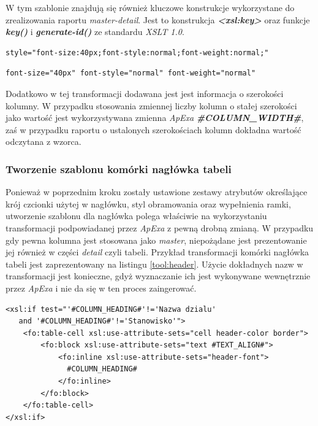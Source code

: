 \documentclass[11pt,a4paper]{article}
\begin{document}
W tym szablonie znajdują się również kluczowe konstrukcje wykorzystane do zrealizowania raportu \emph{master-detail}. Jest to konstrukcja \emph{\textbf{\textless xsl:key\textgreater}} oraz funkcje \emph{\textbf{key()}} i \emph{\textbf{generate-id()}} ze standardu \emph{XSLT 1.0}.

\lstset{}
\begin{lstlisting}[frame=single,caption=Przykład stylu obiektu utworzonego w programie \emph{InkScape}, label=con:css]
style="font-size:40px;font-style:normal;font-weight:normal;"
\end{lstlisting}

\lstset{}
\begin{lstlisting}[frame=single,caption=Przykład wymaganej postaci stylu obiektu, label=con:apex]
font-size="40px" font-style="normal" font-weight="normal"
\end{lstlisting}

Dodatkowo w tej transformacji dodawana jest jest informacja o szerokości kolumny. W przypadku stosowania zmiennej liczby kolumn o stałej szerokości jako wartość jest wykorzystywana zmienna \emph{ApExa} \textbf{\emph{\#COLUMN\_WIDTH\#}}, zaś w przypadku raportu o ustalonych szerokościach kolumn dokładna wartość odczytana z wzorca.


\subsubsection{Tworzenie szablonu komórki nagłówka tabeli} \label{table:header}
Ponieważ w poprzednim kroku zostały ustawione zestawy atrybutów określające krój czcionki użytej w nagłówku, styl obramowania oraz wypełnienia ramki, utworzenie szablonu dla nagłówka polega właściwie na wykorzystaniu transformacji podpowiadanej przez \emph{ApExa} z pewną drobną zmianą. W przypadku gdy pewna kolumna jest stosowana jako \emph{master}, niepożądane jest prezentowanie jej również w części \emph{detail} czyli tabeli. Przykład transformacji komórki nagłówka tabeli jest zaprezentowany na listingu \ref{tool:header}. Użycie dokładnych nazw w transformacji jest konieczne, gdyż wyznaczanie ich jest wykonywane wewnętrznie przez \emph{ApExa} i nie da się w ten proces zaingerować.

\lstset{language=XSLT}
\begin{lstlisting}[frame=single,caption=Transformacja dla nagłówka tabeli, label=tool:header]
<xsl:if test="'#COLUMN_HEADING#'!='Nazwa dzialu' 
   and '#COLUMN_HEADING#'!='Stanowisko'">
    <fo:table-cell xsl:use-attribute-sets="cell header-color border">
        <fo:block xsl:use-attribute-sets="text #TEXT_ALIGN#">
            <fo:inline xsl:use-attribute-sets="header-font">
              #COLUMN_HEADING#
            </fo:inline>
        </fo:block>
    </fo:table-cell>
</xsl:if>

\end{lstlisting}
\end{document}
